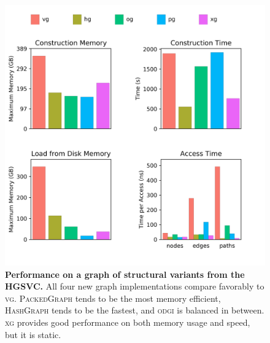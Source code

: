 \documentclass{article}
\begin{document}





\begin{figure}
	\begin{center}
		\includegraphics[width=1.0\textwidth]{figures/HGSVC_sorted_gfa.png}
	\end{center}
	\caption{{\label{fig:hgsvc}
        \textbf{Performance on a graph of structural variants from the HGSVC.}
        All four new graph implementations compare favorably to \textsc{vg}.
        \textsc{PackedGraph} tends to be the most memory efficient, \textsc{HashGraph} tends to be the fastest, and \textsc{odgi} is balanced in between.
        \textsc{xg} provides good performance on both memory usage and speed, but it is static.}}
\end{figure}
\end{document}
